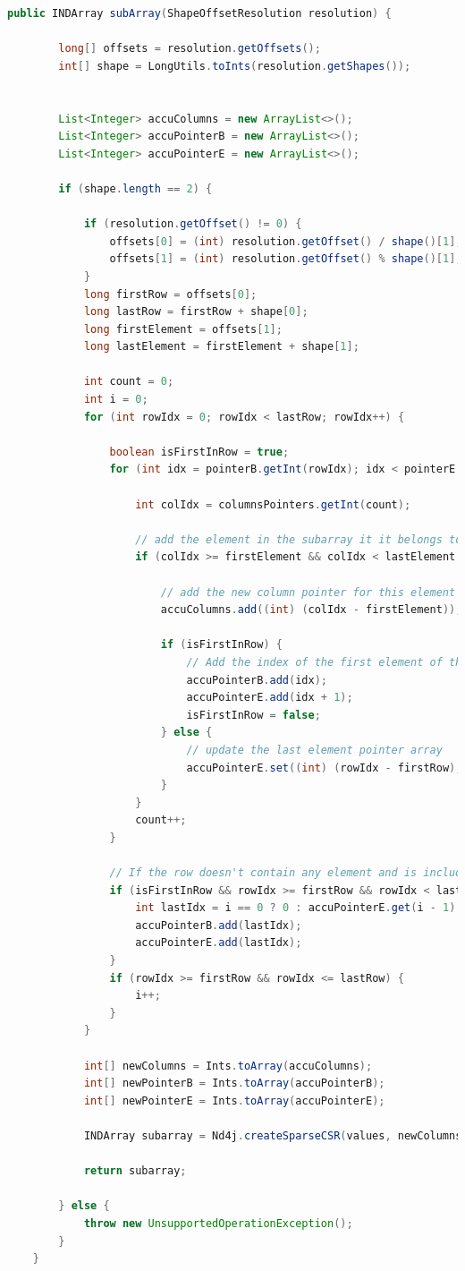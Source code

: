 \begin{lstlisting}[caption=Extract a sub-array of a CSR matrix\label{lst:getcsc},language=Java]
	public INDArray subArray(ShapeOffsetResolution resolution) {
		
		long[] offsets = resolution.getOffsets();
		int[] shape = LongUtils.toInts(resolution.getShapes());
		
		
		List<Integer> accuColumns = new ArrayList<>();
		List<Integer> accuPointerB = new ArrayList<>();
		List<Integer> accuPointerE = new ArrayList<>();
		
		if (shape.length == 2) {
		
			if (resolution.getOffset() != 0) {
				offsets[0] = (int) resolution.getOffset() / shape()[1];
				offsets[1] = (int) resolution.getOffset() % shape()[1];
			}
			long firstRow = offsets[0];
			long lastRow = firstRow + shape[0];
			long firstElement = offsets[1];
			long lastElement = firstElement + shape[1];
			
			int count = 0;
			int i = 0;
			for (int rowIdx = 0; rowIdx < lastRow; rowIdx++) {	
				
				boolean isFirstInRow = true;
				for (int idx = pointerB.getInt(rowIdx); idx < pointerE.getInt(rowIdx); idx++) {
				
					int colIdx = columnsPointers.getInt(count);
					
					// add the element in the subarray it it belongs to the view
					if (colIdx >= firstElement && colIdx < lastElement && rowIdx >= firstRow && rowIdx < lastRow) {
						
						// add the new column pointer for this element
						accuColumns.add((int) (colIdx - firstElement));
						
						if (isFirstInRow) {
							// Add the index of the first element of the row in the pointer array
							accuPointerB.add(idx);
							accuPointerE.add(idx + 1);
							isFirstInRow = false;
						} else {
							// update the last element pointer array
							accuPointerE.set((int) (rowIdx - firstRow), idx + 1);
						}
					}			
					count++;
				}
				
				// If the row doesn't contain any element and is included in the selected rows
				if (isFirstInRow && rowIdx >= firstRow && rowIdx < lastRow) {
					int lastIdx = i == 0 ? 0 : accuPointerE.get(i - 1);
					accuPointerB.add(lastIdx);
					accuPointerE.add(lastIdx);
				}
				if (rowIdx >= firstRow && rowIdx <= lastRow) {
					i++;
				}
			}
			
			int[] newColumns = Ints.toArray(accuColumns);
			int[] newPointerB = Ints.toArray(accuPointerB);
			int[] newPointerE = Ints.toArray(accuPointerE);
			
			INDArray subarray = Nd4j.createSparseCSR(values, newColumns, newPointerB, newPointerE, shape);
			
			return subarray;
		
		} else {
			throw new UnsupportedOperationException();
		}
	}
		\end{lstlisting}

